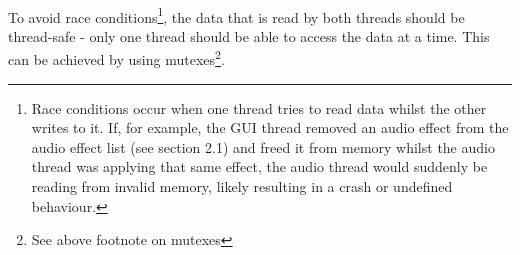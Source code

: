 \paragraph{}
To avoid race conditions\footnote{
	 Race conditions occur when one thread tries to read data whilst the other writes to it. If, for example, the GUI thread removed an audio effect from the audio effect list (see section 2.1) and freed it from memory whilst the audio thread was applying that same effect, the audio thread would suddenly be reading from invalid memory, likely resulting in a crash or undefined behaviour.
}, the data that is read by both threads should be thread-safe - only one thread should be able to access the data at a time. This can be achieved by using mutexes\footnote{See above footnote on mutexes}.


